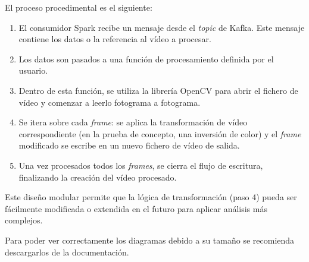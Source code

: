El proceso procedimental es el siguiente:
\begin{enumerate}
    \item El consumidor Spark recibe un mensaje desde el \textit{topic} de Kafka. Este mensaje contiene los datos o la referencia al vídeo a procesar.
    \item Los datos son pasados a una función de procesamiento definida por el usuario.
    \item Dentro de esta función, se utiliza la librería OpenCV para abrir el fichero de vídeo y comenzar a leerlo fotograma a fotograma.
    \item Se itera sobre cada \textit{frame}: se aplica la transformación de vídeo correspondiente (en la prueba de concepto, una inversión de color) y el \textit{frame} modificado se escribe en un nuevo fichero de vídeo de salida.
    \item Una vez procesados todos los \textit{frames}, se cierra el flujo de escritura, finalizando la creación del vídeo procesado.
\end{enumerate}
Este diseño modular permite que la lógica de transformación (paso 4) pueda ser fácilmente modificada o extendida en el futuro para aplicar análisis más complejos.

Para poder ver correctamente los diagramas debido a su tamaño se recomienda descargarlos de la documentación.